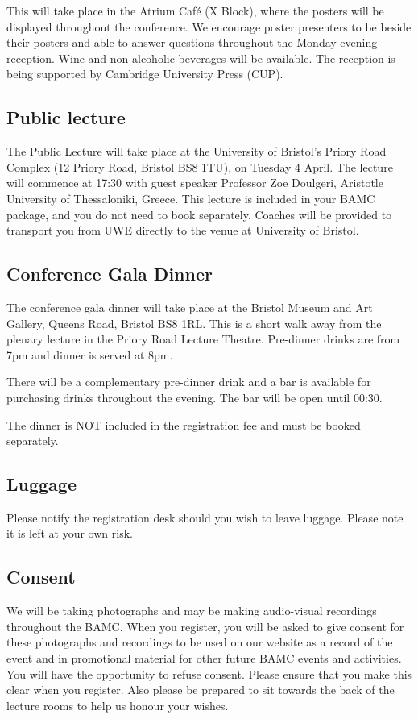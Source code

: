 \documentclass[12pt,a4paper]{article}
\begin{document}
This will take place in the Atrium Café (X Block), where the posters will be displayed throughout the conference. We encourage poster presenters to be beside their posters and able to answer questions throughout the Monday evening reception. Wine and non-alcoholic beverages will be available. The reception is being supported by Cambridge University Press (CUP).

\subsection{Public lecture}

The Public Lecture will take place at the University of Bristol's Priory Road Complex (12 Priory Road, Bristol BS8 1TU), on Tuesday 4 April. The lecture will commence at 17:30 with guest speaker Professor Zoe Doulgeri, Aristotle University of Thessaloniki, Greece. This lecture is included in your BAMC package, and you do not need to book separately. Coaches will be provided to transport you from UWE directly to the venue at University of Bristol.

\subsection{Conference Gala Dinner}

The conference gala dinner will take place at the Bristol Museum and Art Gallery, Queens Road, Bristol BS8 1RL. This is a short walk away from the plenary lecture in the Priory Road Lecture Theatre. Pre-dinner drinks are from 7pm and dinner is served at 8pm.

There will be a complementary pre-dinner drink and a bar is available for purchasing drinks throughout the evening. The bar will be open until 00:30.

The dinner is NOT included in the registration fee and must be booked separately.

\subsection{Luggage}

Please notify the registration desk should you wish to leave luggage. Please note it is left at your own risk.

\subsection{Consent}

We will be taking photographs and may be making audio-visual recordings throughout the BAMC. When you register, you will be asked to give consent for these photographs and recordings to be used on our website as a record of the event and in promotional material for other future BAMC events and activities. You will have the opportunity to refuse consent. Please ensure that you make this clear when you register. Also please be prepared to sit towards the back of the lecture rooms to help us honour your wishes.
\end{document}
